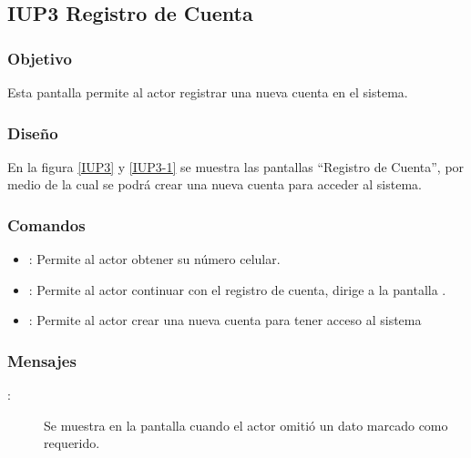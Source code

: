 \subsection{IUP3 Registro de Cuenta}
 
\subsubsection{Objetivo}

    Esta pantalla permite al actor registrar una nueva cuenta en el sistema.

\subsubsection{Diseño}

    En la figura \ref{IUP3} y \ref{IUP3-1}  se muestra las pantallas ``Registro de Cuenta'', por medio de la cual se podrá crear una nueva cuenta para  acceder al sistema. \\

    \newpage

\subsubsection{Comandos}
\begin{itemize}
    \item {}: Permite al actor obtener su número celular.
    \item {}: Permite al actor continuar con el registro de cuenta, dirige a la pantalla .
    \item {}: Permite al actor crear una nueva cuenta para tener acceso al sistema
    
\end{itemize}

\subsubsection{Mensajes}

\begin{description}
    \item[:] Se muestra en la pantalla  cuando el actor omitió un dato marcado como requerido.
    
\end{description}
